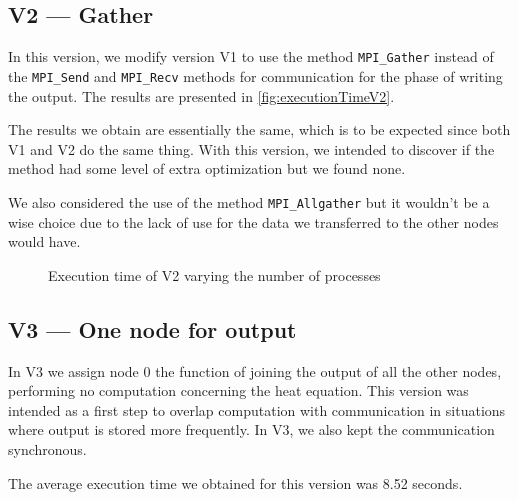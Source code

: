 \documentclass[conference]{IEEEtran}
\begin{document}
\subsection{V2 --- Gather}\label{sec:v2}
In this version, we modify version V1 to use the method \texttt{MPI\_Gather} instead of the \texttt{MPI\_Send} and \texttt{MPI\_Recv} methods for communication for the phase of writing the output. The results are presented in \autoref{fig:executionTimeV2}.

The results we obtain are essentially the same, which is to be expected since both V1 and V2 do the same thing. With this version, we intended to discover if the method had some level of extra optimization but we found none.

We also considered the use of the method \texttt{MPI\_Allgather} but it wouldn't be a wise choice due to the lack of use for the data we transferred to the other nodes would have.

\begin{figure}[ht]
  \centering
  \caption{Execution time of V2 varying the number of processes}
  \label{fig:executionTimeV2}
\end{figure}

\subsection{V3 --- One node for output}
In V3 we assign node 0 the function of joining the output of all the other nodes, performing no computation concerning the heat equation. This version was intended as a first step to overlap computation with communication in situations where output is stored more frequently. In V3, we also kept the communication synchronous.

The average execution time we obtained for this version was 8.52 seconds.
\end{document}
